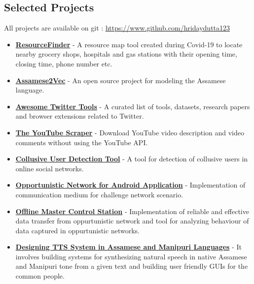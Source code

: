 \documentclass[margin, centered]{res}
\begin{document}
\begin{resume}
\section{Selected Projects}
All projects are available on git : \url{https://www.github.com/hridaydutta123}
\begin{itemize}[leftmargin=*]
 \item \textbf{\href{https://resource-finder.github.io/}{ResourceFinder}} - A resource map tool created during Covid-19 to locate nearby grocery shops, hospitals and gas stations with their opening time, closing time, phone number etc.

 \item \textbf{\href{https://github.com/hridaydutta123/Assamese2Vec}{Assamese2Vec}} - An open source project for modeling the Assamese language.

 \item \textbf{\href{https://github.com/hridaydutta123/awesome-twitter-tools}{Awesome Twitter Tools}} - A curated list of tools, datasets, research papers and browser extensions related to Twitter.

 \item \textbf{\href{https://github.com/hridaydutta123/the-youtube-scraper}{The YouTube Scraper}} - Download YouTube video description and video comments without using the YouTube API.

 \item \textbf{\href{https://github.com/hridaydutta123/collusive-user-detection-tool}{Collusive User Detection Tool}} - A tool for detection of collusive users in online social networks.

 \item \textbf{\href{https://github.com/ItsForkIT/pdm}{Opportunistic Network for Android Application}} - Implementation of communication medium for challenge network scenario. 
 \item \textbf{\href{http://www.github.com/hridaydutta123/offlinemcs}{Offline Master Control Station}} - Implementation of reliable and effective data transfer from oppurtunistic network and tool for analyzing behaviour of data captured in oppurtunistic networks.
 \item \textbf{\href{http://www.iitg.ernet.in/cseweb/tts/tts/Assamese/}{Designing TTS System in Assamese and Manipuri Languages}} - It involves building systems for synthesizing natural speech in native Assamese and Manipuri tone from a given text and building user friendly GUIs for the common people.


\end{itemize}
\end{resume}
\end{document}

